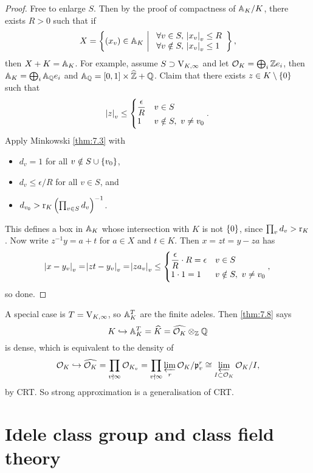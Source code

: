 \begin{proof}
Free to enlarge $ S $. Then by the proof of compactness of $ \AA_K / K $, there exists $ R > 0 $ such that if
$$ X = \cbr{\br{x_v} \in \AA_K \st \begin{array}{l} \forall v \in S, \ \abs{x_v}_v \le R \\ \forall v \notin S, \ \abs{x_v}_v \le 1 \end{array}}, $$
then $ X + K = \AA_K $. For example, assume $ S \supset \V_{K, \infty} $ and let $ \OOO_K = \bigoplus_i \ZZ e_i $, then $ \AA_K = \bigoplus_i \AA_\QQ e_i $ and $ \AA_\QQ = \sbr{0, 1} \times \widehat{\ZZ} + \QQ $. Claim that there exists $ z \in K \setminus \cbr{0} $ such that
$$ \abs{z}_v \le
\begin{cases}
\dfrac{\epsilon}{R} & v \in S \\
1 & v \notin S, \ v \ne v_0
\end{cases}.
$$
Apply Minkowski \ref{thm:7.3} with
\begin{itemize}
\item $ d_v = 1 $ for all $ v \notin S \cup \cbr{v_0} $,
\item $ d_v \le \epsilon / R $ for all $ v \in S $, and
\item $ d_{v_0} > \r_K\br{\prod_{v \in S} d_v}^{-1} $.
\end{itemize}
This defines a box in $ \AA_K $ whose intersection with $ K $ is not $ \cbr{0} $, since $ \prod_v d_v > \r_K $. Now write $ z^{-1}y = a + t $ for $ a \in X $ and $ t \in K $. Then $ x = zt = y - za $ has
$$ \abs{x - y_v}_v = \abs{zt - y_v}_v = \abs{za_v}_v \le
\begin{cases}
\dfrac{\epsilon}{R} \cdot R = \epsilon & v \in S \\
1 \cdot 1 = 1 & v \notin S, \ v \ne v_0
\end{cases},
$$
so done.
\end{proof}

A special case is $ T = \V_{K, \infty} $, so $ \AA_K^T $ are the finite adeles. Then \ref{thm:7.8} says
$$ K \hookrightarrow \AA_K^T = \widehat{K} = \widehat{\OOO_K} \otimes_\ZZ \QQ $$
is dense, which is equivalent to the density of
$$ \OOO_K \hookrightarrow \widehat{\OOO_K} = \prod_{v \nmid \infty} \OOO_{K_v} = \prod_{v \nmid \infty} \varprojlim_r \OOO_K / \ppp_v^r \cong \varprojlim_{I \subset \OOO_K} \OOO_K / I, $$
by CRT. So strong approximation is a generalisation of CRT.

\pagebreak

\section{Idele class group and class field theory}

